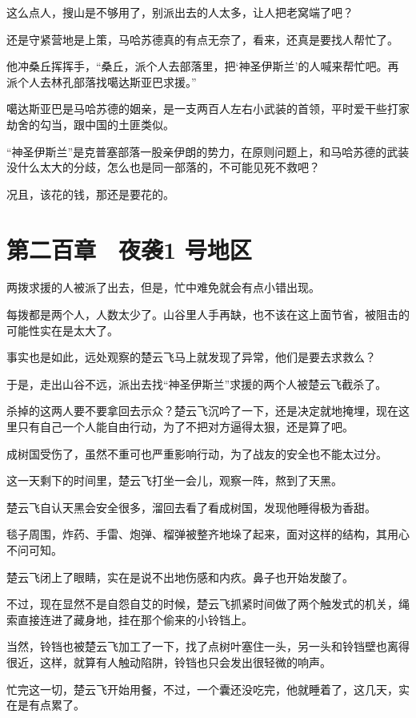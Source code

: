 这么点人，搜山是不够用了，别派出去的人太多，让人把老窝端了吧？

还是守紧营地是上策，马哈苏德真的有点无奈了，看来，还真是要找人帮忙了。

他冲桑丘挥挥手，“桑丘，派个人去部落里，把‘神圣伊斯兰’的人喊来帮忙吧。再派个人去林孔部落找噶达斯亚巴求援。”

噶达斯亚巴是马哈苏德的姻亲，是一支两百人左右小武装的首领，平时爱干些打家劫舍的勾当，跟中国的土匪类似。

“神圣伊斯兰”是克普塞部落一股亲伊朗的势力，在原则问题上，和马哈苏德的武装没什么太大的分歧，怎么也是同一部落的，不可能见死不救吧？

况且，该花的钱，那还是要花的。

\section{第二百章　夜袭1 号地区}

两拨求援的人被派了出去，但是，忙中难免就会有点小错出现。

每拨都是两个人，人数太少了。山谷里人手再缺，也不该在这上面节省，被阻击的可能性实在是太大了。

事实也是如此，远处观察的楚云飞马上就发现了异常，他们是要去求救么？

于是，走出山谷不远，派出去找“神圣伊斯兰”求援的两个人被楚云飞截杀了。

杀掉的这两人要不要拿回去示众？楚云飞沉吟了一下，还是决定就地掩埋，现在这里只有自己一个人能自由行动，为了不把对方逼得太狠，还是算了吧。

成树国受伤了，虽然不重可也严重影响行动，为了战友的安全也不能太过分。

这一天剩下的时间里，楚云飞打坐一会儿，观察一阵，熬到了天黑。

楚云飞自认天黑会安全很多，溜回去看了看成树国，发现他睡得极为香甜。

毯子周围，炸药、手雷、炮弹、榴弹被整齐地垛了起来，面对这样的结构，其用心不问可知。

楚云飞闭上了眼睛，实在是说不出地伤感和内疚。鼻子也开始发酸了。

不过，现在显然不是自怨自艾的时候，楚云飞抓紧时间做了两个触发式的机关，绳索直接连进了藏身地，挂在那个偷来的小铃铛上。

当然，铃铛也被楚云飞加工了一下，找了点树叶塞住一头，另一头和铃铛壁也离得很近，这样，就算有人触动陷阱，铃铛也只会发出很轻微的响声。

忙完这一切，楚云飞开始用餐，不过，一个囊还没吃完，他就睡着了，这几天，实在是有点累了。

